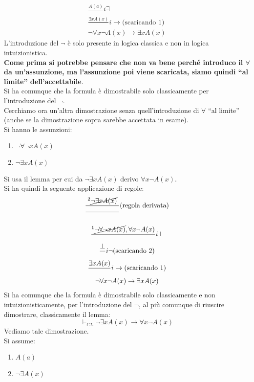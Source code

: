 \documentclass[a4paper,12pt, oneside]{book}
\begin{document}
\begin{esempio}
\begin{gather*}
    \frac{A(a)}{}i\exists\\
    \frac{\exists xA(x)}{}i\to\mbox{(scaricando 1)}\\
    \neg \forall x\neg A(x)\to\exists xA(x)
  \end{gather*}
  L'introduzione del $\neg$ è solo presente in logica classica e non in logica
  intuizionistica.\\
  \textbf{Come prima si potrebbe pensare che non va bene perché introduco il
    $\forall$ da un'assunzione, ma l'assunzione poi viene scaricata, siamo
    quindi ``al limite'' dell'accettabile}.\\ 
  Si ha comunque che la formula è dimostrabile solo classicamente per
  l'introduzione del $\neg$.\\
  Cerchiamo ora un'altra dimostrazione senza quell'introduzione di $\forall$
  ``al limite'' (anche se la dimostrazione sopra sarebbe accettata in esame).\\
  Si hanno le assunzioni:
  \begin{enumerate}
    \item $\neg \forall\neg x A(x)$
    \item $\neg \exists xA(x)$
  \end{enumerate}
  Si usa il lemma per cui da $\neg \exists xA(x)$ derivo $\forall x\neg A(x)$.\\
  Si ha quindi la seguente applicazione di regole:
  \begin{gather*}
    \frac{^2\cancel{\neg \exists xA(x)}}{\rule{49pt}{0.4pt}}\mbox{(regola
      derivata)}\\ 
    \\
    \frac{^1\cancel{\neg \forall\neg x A(x)}, \forall x\neg A(x)}{}i\bot\\
    \frac{\bot}{}i\neg\mbox{(scaricando 2)}\\
    \frac{\exists x A(x)}{}i\to\mbox{(scaricando 1)}\\
    \neg \forall x\neg A(x)\to\exists xA(x)
  \end{gather*}
  Si ha comunque che la formula è dimostrabile solo classicamente e non
  intuizionisticamente, per 
  l'introduzione del $\neg$, al più comunque di riuscire dimostrare,
  classicamente il lemma:
  \[\vdash_{CL}\neg\exists x A(x)\to \forall x \neg A(x)\]
  Vediamo tale dimostrazione.\\
  Si assume:
  \begin{enumerate}
    \item $A(a)$
    \item $\neg \exists A(x)$

\end{enumerate}
\end{esempio}
\end{document}
